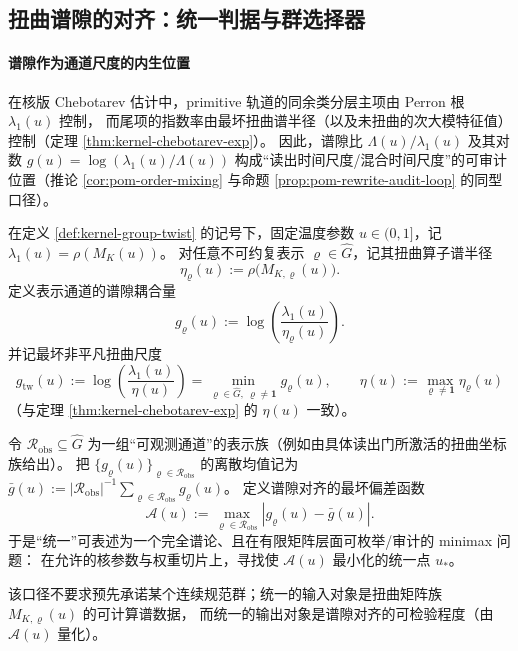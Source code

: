 \subsection{扭曲谱隙的对齐：统一判据与群选择器}\label{subsec:group-unification-spectral-alignment}

\paragraph{谱隙作为通道尺度的内生位置}
在核版 Chebotarev 估计中，primitive 轨道的同余类分层主项由 Perron 根 \(\lambda_1(u)\) 控制，
而尾项的指数率由最坏扭曲谱半径（以及未扭曲的次大模特征值）控制（定理 \ref{thm:kernel-chebotarev-exp}）。
因此，谱隙比 \(\Lambda(u)/\lambda_1(u)\) 及其对数
\(
g(u)=\log(\lambda_1(u)/\Lambda(u))
\)
构成“读出时间尺度/混合时间尺度”的可审计位置（推论 \ref{cor:pom-order-mixing} 与命题 \ref{prop:pom-rewrite-audit-loop} 的同型口径）。

\begin{definition}\label{def:spec-coupling}
在定义 \ref{def:kernel-group-twist} 的记号下，固定温度参数 \(u\in(0,1]\)，记 \(\lambda_1(u)=\rho(M_K(u))\)。
对任意不可约复表示 \(\varrho\in\widehat G\)，记其扭曲算子谱半径
\[
\eta_{\varrho}(u):=\rho\!\bigl(M_{K,\varrho}(u)\bigr).
\]
定义表示通道的谱隙耦合量
\[
g_{\varrho}(u):=\log\!\left(\frac{\lambda_1(u)}{\eta_{\varrho}(u)}\right).
\]
并记最坏非平凡扭曲尺度
\[
g_{\mathrm{tw}}(u):=\log\!\left(\frac{\lambda_1(u)}{\eta(u)}\right)
=\min_{\varrho\in\widehat G,\ \varrho\ne \mathbf{1}} g_{\varrho}(u),
\qquad
\eta(u):=\max_{\varrho\ne\mathbf{1}}\eta_{\varrho}(u)
\]
（与定理 \ref{thm:kernel-chebotarev-exp} 的 \(\eta(u)\) 一致）。
\end{definition}

\begin{remark}\label{rem:spec-gap-minimax-unification}
令 \(\mathcal{R}_{\mathrm{obs}}\subseteq \widehat G\) 为一组“可观测通道”的表示族（例如由具体读出门所激活的扭曲坐标族给出）。
把 \(\{g_{\varrho}(u)\}_{\varrho\in\mathcal{R}_{\mathrm{obs}}}\) 的离散均值记为
\(
\bar g(u):=|\mathcal{R}_{\mathrm{obs}}|^{-1}\sum_{\varrho\in\mathcal{R}_{\mathrm{obs}}}g_{\varrho}(u)
\)。
定义谱隙对齐的最坏偏差函数
\[
\mathcal{A}(u):=\max_{\varrho\in\mathcal{R}_{\mathrm{obs}}}\left|g_{\varrho}(u)-\bar g(u)\right|.
\]
于是“统一”可表述为一个完全谱论、且在有限矩阵层面可枚举/审计的 minimax 问题：
在允许的核参数与权重切片上，寻找使 \(\mathcal{A}(u)\) 最小化的统一点 \(u_\ast\)。
\par
该口径不要求预先承诺某个连续规范群；统一的输入对象是扭曲矩阵族 \(M_{K,\varrho}(u)\) 的可计算谱数据，
而统一的输出对象是谱隙对齐的可检验程度（由 \(\mathcal{A}(u)\) 量化）。
\end{remark}

